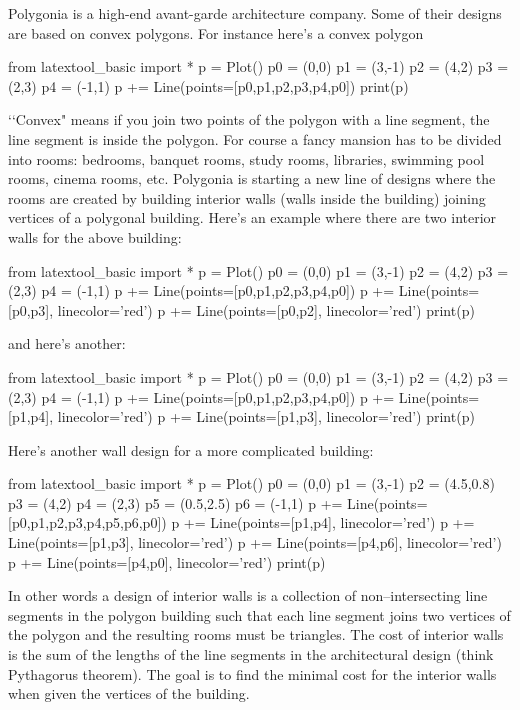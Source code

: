 Polygonia is a high-end avant-garde architecture company.
Some of their designs are based on convex polygons.
For instance here's a convex polygon

\begin{python}
from latextool_basic import *
p = Plot()
p0 = (0,0)
p1 = (3,-1)
p2 = (4,2)
p3 = (2,3)
p4 = (-1,1)
p += Line(points=[p0,p1,p2,p3,p4,p0])
print(p)
\end{python}

\lq\lq Convex" means if you join two points of the polygon with a line segment,
the line segment is inside the polygon.
For course a fancy mansion has to be divided into rooms: bedrooms, banquet rooms,
study rooms, libraries, swimming pool rooms, cinema rooms, etc.
Polygonia is starting a new line of designs where
the rooms are created by building interior walls (walls inside the building)
joining vertices of a polygonal
building.
Here's an example where there are two interior walls for the above building:

\begin{python}
from latextool_basic import *
p = Plot()
p0 = (0,0)
p1 = (3,-1)
p2 = (4,2)
p3 = (2,3)
p4 = (-1,1)
p += Line(points=[p0,p1,p2,p3,p4,p0])
p += Line(points=[p0,p3], linecolor='red')
p += Line(points=[p0,p2], linecolor='red')
print(p)
\end{python}

and here's another:

\begin{python}
from latextool_basic import *
p = Plot()
p0 = (0,0)
p1 = (3,-1)
p2 = (4,2)
p3 = (2,3)
p4 = (-1,1)
p += Line(points=[p0,p1,p2,p3,p4,p0])
p += Line(points=[p1,p4], linecolor='red')
p += Line(points=[p1,p3], linecolor='red')
print(p)
\end{python}

Here's another wall design for a more complicated building:

\begin{python}
from latextool_basic import *
p = Plot()
p0 = (0,0)
p1 = (3,-1)
p2 = (4.5,0.8)
p3 = (4,2)
p4 = (2,3)
p5 = (0.5,2.5)
p6 = (-1,1)
p += Line(points=[p0,p1,p2,p3,p4,p5,p6,p0])
p += Line(points=[p1,p4], linecolor='red')
p += Line(points=[p1,p3], linecolor='red')
p += Line(points=[p4,p6], linecolor='red')
p += Line(points=[p4,p0], linecolor='red')
print(p)
\end{python}

In other words a design of interior walls is a collection of non--intersecting
line segments in the polygon building
such that each line segment joins two vertices of the polygon
and
the resulting rooms must be triangles.
The cost of interior walls is the sum of the lengths of the line segments
in the architectural design (think Pythagorus theorem).
The goal is to find the minimal cost for the interior
walls when given the vertices of the building.

